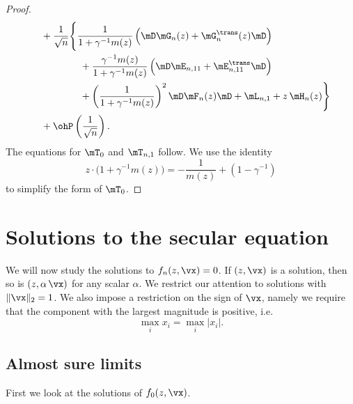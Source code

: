 \begin{proof}
\[\begin{split}
                &\quad+
                \frac{1}{\sqrt{n}} \Bigg\{
                    \frac{1}{1 + \gamma^{-1} m(z)}
                        \left( 
                            \mD \mG_n(z) 
                            + \mG_n^\trans(z) \mD 
                        \right) \\
                    &\quad\qquad\qquad+
                    \frac{\gamma^{-1} m(z)}{1 + \gamma^{-1} m(z)}
                    \left( \mD \mE_{n,11} + \mE_{n,11}^\trans \mD \right) \\
                    &\quad\qquad\qquad+
                    \left(
                        \frac{1}{1 + \gamma^{-1} m(z)}
                    \right)^2
                    \mD \mF_n(z) \mD
                    +
                    \mL_{n,1}
                    +
                    z \, \mH_n( z ) \Bigg\} \\
                &\quad+
                \ohP\left( \frac{1}{\sqrt{n}} \right).
        \end{split}
    \]
    The equations for $\mT_0$ and $\mT_{n,1}$ follow.  We use the identity
    \[
        z
        \cdot
        \Big(
            1
            +
            \gamma^{-1} m(z)
        \Big)
        =
        -
        \frac{1}{m(z)}
        +
        (1 - \gamma^{-1})
    \]
    to simplify the form of $\mT_0$.
\end{proof}

\section{Solutions to the secular equation}

We will now study the solutions to $f_{n}(z, \vx) = 0$.  If $(z, \vx)$
is a solution, then so is $(z, \alpha \, \vx)$ for any scalar $\alpha$.  We restrict our attention to solutions with $\|\vx \|_2 = 1$.  We also impose a restriction on the sign of $\vx$, namely we require that the component with the largest magnitude is positive, i.e.
\begin{equation}\label{E:x-identifiability}
    \max_i x_i = \max_i | x_i |.
\end{equation}

\subsection{Almost sure limits}

First we look at the solutions of $f_0(z, \vx)$.  

